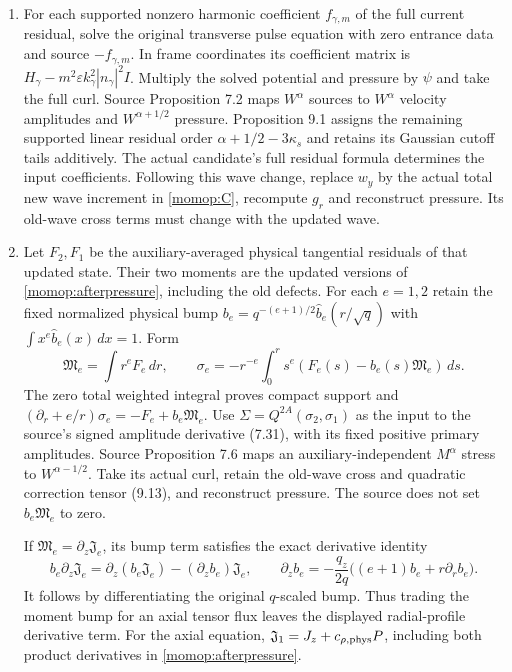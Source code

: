 \documentclass[11pt]{article}
\begin{document}
\begin{enumerate}
\item For each supported nonzero harmonic coefficient $f_{\gamma,m}$
of the full current residual, solve the original transverse pulse
equation with zero entrance data and source $-f_{\gamma,m}$.
In frame coordinates its coefficient matrix is
$H_\gamma-m^2\varepsilon k_\gamma^2|n_\gamma|^2I$.
Multiply the solved potential and pressure by $\psi$ and take the
full curl. Source Proposition 7.2 maps $W^\alpha$ sources to
$W^\alpha$ velocity amplitudes and $W^{\alpha+1/2}$ pressure.
Proposition 9.1 assigns the remaining supported linear residual
order $\alpha+1/2-3\kappa_s$ and retains its Gaussian cutoff tails
additively. The actual candidate's full residual formula determines
the input coefficients. Following this wave change, replace $w_y$
by the actual total new wave increment in \eqref{momop:C}, recompute
$g_r$ and reconstruct pressure. Its old-wave cross terms must change
with the updated wave.

\item Let $F_2,F_1$ be the auxiliary-averaged physical tangential
residuals of that updated state. Their two moments are the updated
versions of \eqref{momop:afterpressure}, including the old defects.
For each $e=1,2$ retain the fixed normalized physical bump
$b_e=q^{-(e+1)/2}\widehat b_e(r/\sqrt q)$ with
$\int x^e\widehat b_e(x)\,dx=1$. Form
\[
 \mathfrak M_e=\int r^eF_e\,dr,\qquad
 \sigma_e=-r^{-e}\int_0^r s^e
                         (F_e(s)-b_e(s)\mathfrak M_e)\,ds .
\]
The zero total weighted integral proves compact support and
$(\partial_r+e/r)\sigma_e=-F_e+b_e\mathfrak M_e$.
Use $\Sigma=Q^{2A}(\sigma_2,\sigma_1)$ as the input to the
source's signed amplitude derivative (7.31), with its fixed
positive primary amplitudes. Source Proposition 7.6 maps an
auxiliary-independent $M^\alpha$ stress to $W^{\alpha-1/2}$.
Take its actual curl, retain the old-wave cross and quadratic
correction tensor (9.13), and reconstruct pressure. The source
does not set $b_e\mathfrak M_e$ to zero.

If $\mathfrak M_e=\partial_z\mathfrak J_e$, its bump term satisfies
the exact derivative identity
\[
 b_e\partial_z\mathfrak J_e
 =\partial_z(b_e\mathfrak J_e)-(\partial_zb_e)\mathfrak J_e,\qquad
 \partial_zb_e=-\frac{q_z}{2q}
                    \bigl((e+1)b_e+r\partial_rb_e\bigr).
\]
It follows by differentiating the original $q$-scaled bump.
Thus trading the moment bump for an axial tensor flux leaves the
displayed radial-profile derivative term. For the axial equation,
$\mathfrak J_1=J_z+c_{\rho,\rm phys}P$, including both product
derivatives in \eqref{momop:afterpressure}.


\end{enumerate}
\end{document}
